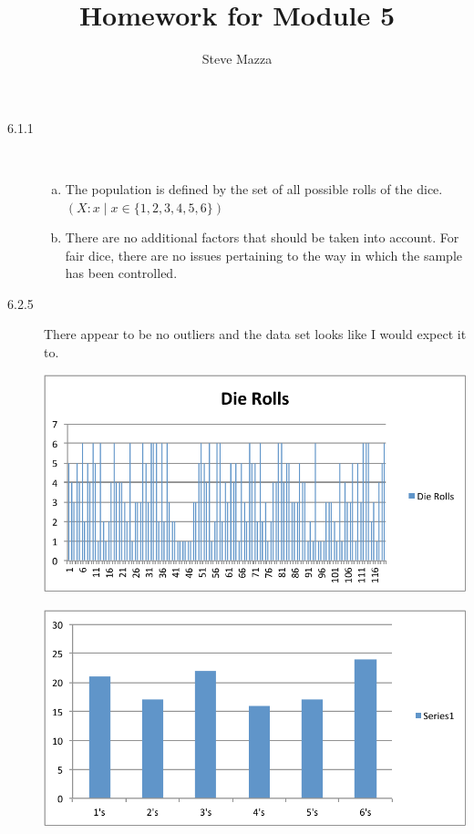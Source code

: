\documentclass[letterpaper,10pt]{article}
\title{Homework for Module 5}
\author{Steve Mazza}
\begin{document}
\maketitle

\begin{description}
\item[6.1.1]\ 
\begin{enumerate}[a)]
\item The population is defined by the set of all possible rolls of the dice.  $(X:x \mid x \in \{1, 2, 3, 4, 5, 6\})$
\item There are no additional factors that should be taken into account.  For fair dice, there are no issues pertaining to the way in which the sample has been controlled.
\end{enumerate}

\item[6.2.5]
There appear to be no outliers and the data set looks like I would expect it to.

\begin{center}
\includegraphics[scale=0.75]{module5b.pdf}
\end{center}

\begin{center}
\includegraphics[scale=0.75]{module5c.pdf}
\end{center}


\end{description}
\end{document}
